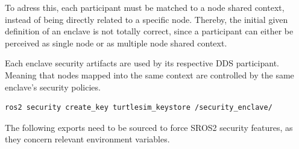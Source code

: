 To adress this, each participant must be matched to a node shared context, instead of being directly related to a specific node. Thereby, the initial given definition of an enclave is not totally correct, since a participant can either be perceived as single node or as multiple node shared context. 
            
Each enclave security artifacts are used by its respective DDS participant. Meaning that nodes mapped into the same context are controlled by the same enclave's security policies. 


\begin{lstlisting}[title={Creation of an \texttt{enclave} into the predefined keystore.}]
ros2 security create_key turtlesim_keystore /security_enclave/
\end{lstlisting}
            
            
The following exports need to be sourced to force SROS2 security features, as they concern relevant environment variables.

